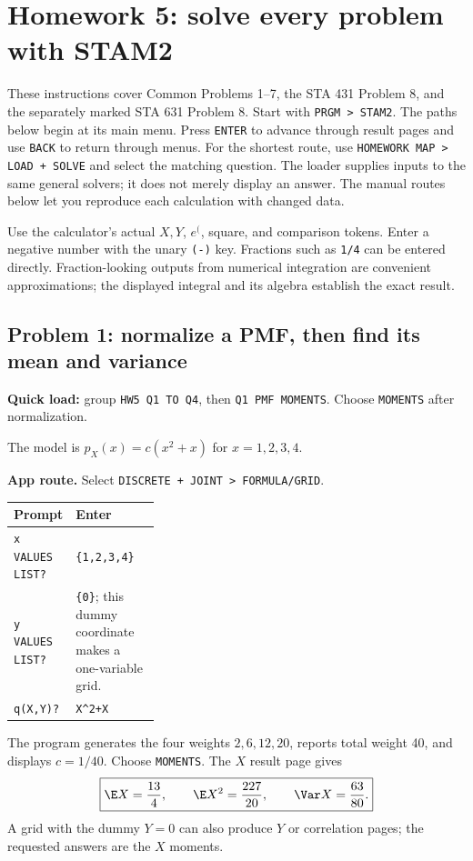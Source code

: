 \section{Homework 5: solve every problem with STAM2}
\label{sec:hw5-app-walkthrough}
These instructions cover Common Problems 1--7, the STA 431 Problem 8, and the separately marked STA 631 Problem 8. Start with \texttt{PRGM > STAM2}. The paths below begin at its main menu. Press \texttt{ENTER} to advance through result pages and use \texttt{BACK} to return through menus. For the shortest route, use \texttt{HOMEWORK MAP > LOAD + SOLVE} and select the matching question. The loader supplies inputs to the same general solvers; it does not merely display an answer. The manual routes below let you reproduce each calculation with changed data.

Use the calculator's actual $X,Y$, $e^{(}$, square, and comparison tokens. Enter a negative number with the unary \texttt{(-)} key. Fractions such as \texttt{1/4} can be entered directly. Fraction-looking outputs from numerical integration are convenient approximations; the displayed integral and its algebra establish the exact result.

\subsection{Problem 1: normalize a PMF, then find its mean and variance}
\textbf{Quick load:} group \texttt{HW5 Q1 TO Q4}, then \texttt{Q1 PMF MOMENTS}. Choose \texttt{MOMENTS} after normalization.

The model is $p_X(x)=c(x^2+x)$ for $x=1,2,3,4$.

\textbf{App route.} Select \texttt{DISCRETE + JOINT > FORMULA/GRID}.
\begin{center}
\begin{tabularx}{\linewidth}{@{}p{0.32\linewidth}X@{}}
\toprule Prompt & Enter\\\midrule
\texttt{x VALUES LIST?} & \texttt{\{1,2,3,4\}}\\
\texttt{y VALUES LIST?} & \texttt{\{0\}}; this dummy coordinate makes a one-variable grid.\\
\texttt{q(X,Y)?} & \texttt{X\^{}2+X}\\\bottomrule
\end{tabularx}
\end{center}
The program generates the four weights $2,6,12,20$, reports total weight 40, and displays $c=1/40$. Choose \texttt{MOMENTS}. The $X$ result page gives
\[
\boxed{\E X=\frac{13}{4},\qquad \E X^2=\frac{227}{20},\qquad \Var X=\frac{63}{80}.}
\]
A grid with the dummy $Y=0$ can also produce $Y$ or correlation pages; the requested answers are the $X$ moments.

